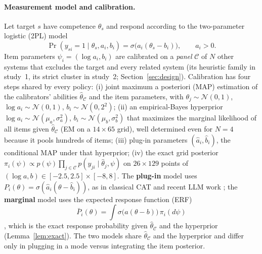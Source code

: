 \paragraph{Measurement model and calibration.} Let target $s$ have competence $\theta_s$ and
respond according to the two-parameter logistic (2PL) model
\begin{equation}
\Pr(y_{si}=1\mid\theta_s,a_i,b_i)=\sigma\big(a_i(\theta_s-b_i)\big),\qquad a_i>0 .
\end{equation}
Item parameters $\psi_i=(\log a_i,b_i)$ are calibrated on a \emph{panel} $\mathcal C$ of $N$
other systems that excludes the target and every related system (its heuristic family in
study~1, its strict cluster in study~2; Section~\ref{sec:design}). Calibration has four
steps shared by every policy: (i) joint maximum a posteriori (MAP) estimation of the
calibrators' abilities $\hat\theta_{\mathcal C}$ and the item parameters, with
$\theta_j\sim\mathcal N(0,1)$, $\log a_i\sim\mathcal N(0,1)$, $b_i\sim\mathcal N(0,2^2)$;
(ii) an empirical-Bayes hyperprior $\log a_i\sim\mathcal N(\mu_a,\sigma_a^2)$,
$b_i\sim\mathcal N(\mu_b,\sigma_b^2)$ that maximizes the marginal likelihood of all items
given $\hat\theta_{\mathcal C}$ (EM on a $14\times65$ grid), well determined even for $N=4$
because it pools hundreds of items; (iii) plug-in parameters $(\hat a_i,\hat b_i)$, the
conditional MAP under that hyperprior; (iv) the exact grid posterior
$\pi_i(\psi)\propto p(\psi)\prod_{j\in\mathcal C}p(y_{ji}\mid\hat\theta_j,\psi)$ on
$26\times129$ points of $(\log a,b)\in[-2.5,2.5]\times[-8,8]$. The \textbf{plug-in} model
uses $P_i(\theta)=\sigma(\hat a_i(\theta-\hat b_i))$, as in classical CAT and recent LLM work
\citep{hofmann2025fluid,li2026atlas}; the \textbf{marginal} model uses the expected
response function (ERF)
\begin{equation}\label{eq:erf}
\bar P_i(\theta)=\int\sigma\big(a(\theta-b)\big)\,\pi_i(d\psi)
\end{equation}
\citep{mislevy1994erf}, which is the exact response probability given
$\hat\theta_{\mathcal C}$ and the hyperprior (Lemma~\ref{lem:exact}). The two models share
$\hat\theta_{\mathcal C}$ and the hyperprior and differ only in plugging in a mode versus
integrating the item posterior.

